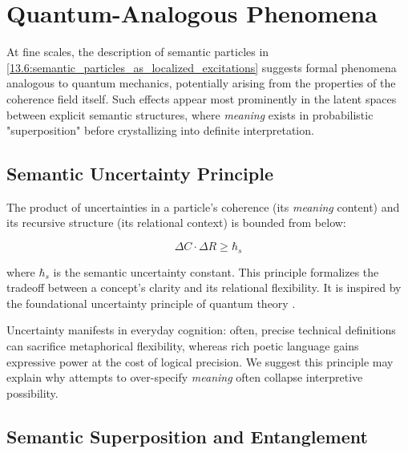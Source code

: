 \section{Quantum-Analogous Phenomena}
\label{13.7:quantum_analogous_phenomena}

At fine scales, the description of semantic particles in \ref{13.6:semantic_particles_as_localized_excitations} suggests formal phenomena analogous to quantum mechanics, potentially arising from the properties of the coherence field itself. Such effects appear most prominently in the latent spaces between explicit semantic structures, where \textit{meaning} exists in probabilistic "superposition" before crystallizing into definite interpretation.


\subsection{Semantic Uncertainty Principle}
\label{13.7.1:semantic_uncertainty_principle}

The product of uncertainties in a particle's coherence (its \textit{meaning} content) and its recursive structure (its relational context) is bounded from below:

\begin{equation}
\Delta C \cdot \Delta R \geq \hbar_s
\end{equation}

where \(\hbar_s\) is the semantic uncertainty constant. This principle formalizes the tradeoff between a concept's clarity and its relational flexibility. It is inspired by the foundational uncertainty principle of quantum theory \autocite{Heisenberg1927, WheelerZurek1983}.

Uncertainty manifests in everyday cognition: often, precise technical definitions can sacrifice metaphorical flexibility, whereas rich poetic language gains expressive power at the cost of logical precision. We suggest this principle may explain why attempts to over-specify \textit{meaning} often collapse interpretive possibility.


\subsection{Semantic Superposition and Entanglement}
\label{13.7.2:semantic_superposition_and_entanglement}


